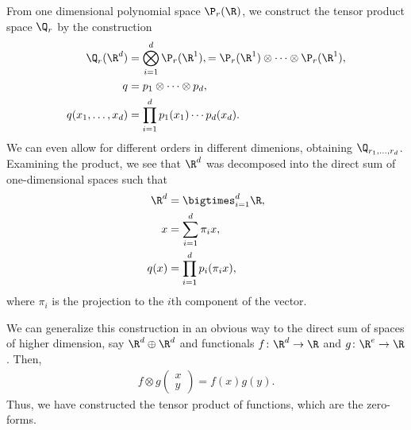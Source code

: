 \begin{intro}
  From one dimensional polynomial space $\P_r(\R)$, we construct the
  tensor product space $\Q_r$ by the construction
  \begin{gather}
    \begin{split}
      \Q_r(\R^d) & = \bigotimes_{i=1}^d \P_r(\R^1),
      = \P_r(\R^1) \otimes\dots\otimes\P_r(\R^1),\\
      q &= p_1 \otimes \dots \otimes p_d,\\
      q(x_1,\dots,x_d) &= \prod_{i=1}^d p_1(x_1)\cdots p_d(x_d).
    \end{split}
  \end{gather}
  We can even allow for different orders in different dimenions,
  obtaining $\Q_{r_1,\dots,r_d}$. Examining the product, we see that
  $\R^d$ was decomposed into the direct sum of one-dimensional spaces
  such that
  \begin{gather}
    \begin{split}
      \R^d &= \bigtimes_{i=1}^d \R,\\
      x &= \sum_{i=1}^d \pi_i x,\\
      q(x) &= \prod_{i=1}^d p_i(\pi_i x),
    \end{split}
  \end{gather}
  where $\pi_i$ is the projection to the $i$th component of the vector.

  We can generalize this construction in an obvious way to the direct
  sum of spaces of higher dimension, say $\R^d\oplus \R^d$ and
  functionals $f\colon \R^d\to \R$ and $g\colon \R^e\to \R$. Then,
  \begin{gather}
    f\otimes g
    \begin{pmatrix}
      x\\y
    \end{pmatrix}
    = f(x) g(y).
  \end{gather}
  Thus, we have constructed the tensor product of functions, which are the zero-forms.
\end{intro}

